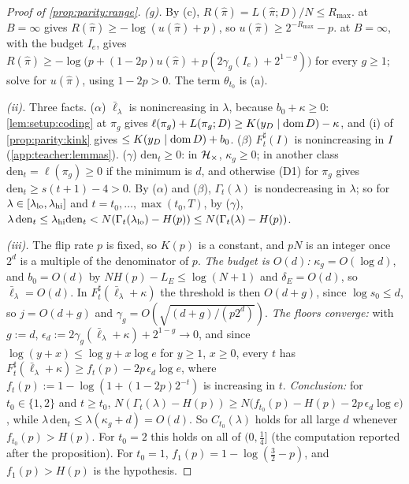 \begin{proof}[Proof of \cref{prop:parity:range}]
\emph{(g).} By (c), $R(\hat\pi)=L(\hat\pi;D)/N\le R_{\max}$.  at $B=\infty$ gives $R(\hat\pi)\ge-\log(u(\hat\pi)+p)$, so $u(\hat\pi)\ge2^{-R_{\max}}-p$.  at $B=\infty$, with the budget $I_e$, gives $R(\hat\pi)\ge-\log\big(p+(1-2p)u(\hat\pi)+p(2\gamma_g(I_e)+2^{1-g})\big)$ for every $g\ge1$; solve for $u(\hat\pi)$, using $1-2p>0$. The term $\theta_{t_0}$ is (a).

\emph{(ii).} Three facts. ($\alpha$) $\bar\ell_\lambda$ is nonincreasing in $\lambda$, because $b_0+\kappa\ge0$: \cref{lem:setup:coding} at $\pi_g$ gives $\ell(\pi_g)+L(\pi_g;D)\ge K(y_D\mid\operatorname{dom} D)-\kappa$, and (i) of \cref{prop:parity:kink} gives $\le K(y_D\mid\operatorname{dom} D)+b_0$. ($\beta$) $F^\sharp_t(I)$ is nonincreasing in $I$ (\cref{app:teacher:lemmas}). ($\gamma$) $\mathrm{den}_t\ge0$: in $\mathcal{H}_{\times}$, $\kappa_g\ge0$; in another class $\mathrm{den}_t=\ell(\pi_g)\ge0$ if the minimum is $d$, and otherwise (D1) for $\pi_g$ gives $\mathrm{den}_t\ge s(t+1)-4>0$. By ($\alpha$) and ($\beta$), $\Gamma_t(\lambda)$ is nondecreasing in $\lambda$; so for $\lambda\in[\lambda_{\rm lo},\lambda_{\rm hi}]$ and $t=t_0,\dots,\max(t_0,T)$, by ($\gamma$), $\lambda\,\mathrm{den}_t\le\lambda_{\rm hi}\mathrm{den}_t<N(\Gamma_t(\lambda_{\rm lo})-H(p))\le N(\Gamma_t(\lambda)-H(p))$.

\emph{(iii).} The flip rate $p$ is fixed, so $K(p)$ is a constant, and $pN$ is an integer once $2^d$ is a multiple of the denominator of $p$. \emph{The budget is $O(d)$:} $\kappa_g=O(\log d)$, and $b_0=O(d)$ by $NH(p)-L_E\le\log(N+1)$ and $\delta_E=O(d)$, so $\bar\ell_\lambda=O(d)$. In $F^\sharp_t(\bar\ell_\lambda+\kappa)$ the threshold is then $O(d+g)$, since $\log s_0\le d$, so $j=O(d+g)$ and $\gamma_g=O(\sqrt{(d+g)/(p2^d)})$. \emph{The floors converge:} with $g:=d$, $\epsilon_d:=2\gamma_g(\bar\ell_\lambda+\kappa)+2^{1-g}\to0$, and since $\log(y+x)\le\log y+x\log e$ for $y\ge1$, $x\ge0$, every $t$ has $F^\sharp_t(\bar\ell_\lambda+\kappa)\ge f_t(p)-2p\,\epsilon_d\log e$, where $f_t(p):=1-\log(1+(1-2p)2^{-t})$ is increasing in $t$. \emph{Conclusion:} for $t_0\in\{1,2\}$ and $t\ge t_0$, $N(\Gamma_t(\lambda)-H(p))\ge N\big(f_{t_0}(p)-H(p)-2p\,\epsilon_d\log e\big)$, while $\lambda\,\mathrm{den}_t\le\lambda(\kappa_g+d)=O(d)$. So $C_{t_0}(\lambda)$ holds for all large $d$ whenever $f_{t_0}(p)>H(p)$. For $t_0=2$ this holds on all of $(0,\frac14]$ (the computation reported after the proposition). For $t_0=1$, $f_1(p)=1-\log(\frac32-p)$, and $f_1(p)>H(p)$ is the hypothesis.
\end{proof}

